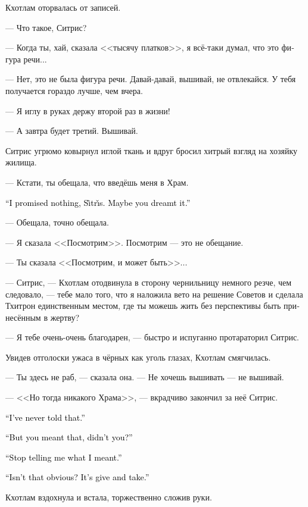 \documentclass[a4paper,12pt,fleqn]{book}\usepackage{cooltooltips}\usepackage{polyglossia}\setdefaultlanguage[babelshorthands=true]{russian}\setotherlanguage{english}\defaultfontfeatures{Ligatures=TeX,Mapping=tex-text} \usepackage{xcolor}\definecolor{lightgray}{HTML}{bbbbbb}\color{lightgray}\newcommand{\ml}[3]{\textenglish{\textcolor{black}{#3}} }
\newcommand{\Sitris}{S\~{\i}tr\v{\i}s}
\begin{document}
Кхотлам оторвалась от записей.

--- Что такое, Ситрис?

--- Когда ты, хай, сказала <<тысячу платков>>, я всё-таки думал, что это фигура речи...

--- Нет, это не была фигура речи.
Давай-давай, вышивай, не отвлекайся.
У тебя получается гораздо лучше, чем вчера.

--- Я иглу в руках держу второй раз в жизни!

--- А завтра будет третий.
Вышивай.

Ситрис угрюмо ковырнул иглой ткань и вдруг бросил хитрый взгляд на хозяйку жилища.

--- Кстати, ты обещала, что введёшь меня в Храм.

\ml{$0$}
{--- Я тебе ничего не обещала, Ситрис.}
{``I promised nothing, \Sitris.}
\ml{$0$}
{Тебе, наверное, приснилось.}
{Maybe you dreamt it.''}

--- Обещала, точно обещала.

--- Я сказала <<Посмотрим>>.
Посмотрим --- это не обещание.

--- Ты сказала <<Посмотрим, и может быть>>...

--- Ситрис, --- Кхотлам отодвинула в сторону чернильницу немного резче, чем следовало, --- тебе мало того, что я наложила вето на решение Советов и сделала Тхитрон единственным местом, где ты можешь жить без перспективы быть принесённым в жертву?

--- Я тебе очень-очень благодарен, --- быстро и испуганно протараторил Ситрис.

Увидев отголоски ужаса в чёрных как уголь глазах, Кхотлам смягчилась.

--- Ты здесь не раб, --- сказала она.
--- Не хочешь вышивать --- не вышивай.

--- <<Но тогда никакого Храма>>, --- вкрадчиво закончил за неё Ситрис.

\ml{$0$}
{--- Я этого не говорила.}
{``I've never told that.''}

\ml{$0$}
{--- Но ты ведь имела это в виду, верно?}
{``But you meant that, didn't you?''}

\ml{$0$}
{--- Хватит говорить мне, что я имела в виду.}
{``Stop telling me what I meant.''}

\ml{$0$}
{--- Разве это не очевидно?}
{``Isn't that obvious?}
\ml{$0$}
{Ты --- мне, я --- тебе.}
{It's give and take.''}

Кхотлам вздохнула и встала, торжественно сложив руки.
\end{document}
